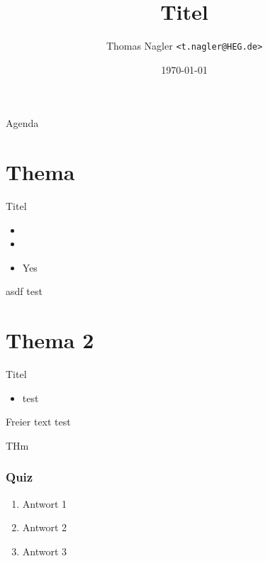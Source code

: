 \documentclass[11pt]{beamer}
\title{Titel}
\institute{Vorlesung}
\date{\today}
\author[T.~Nagler]{Thomas Nagler \texttt{<t.nagler@HEG.de>}}
\begin{document}

{ %
\begin{frame}[noframenumbering] 
	\titlepage
\end{frame}
}


\begin{frame}{Agenda}
	\tableofcontents
\end{frame}


\section{Thema}


\begin{frame}{Titel}

	\begin{itemize}
		\item {}    
		\item  {} 
		\item[\cmark] Yes
	\end{itemize}

	\begin{example}{asdf}
		test
	\end{example}
\end{frame}


\section{Thema 2}

\begin{frame}{Titel}


	\begin{itemize}
		\item test
	\end{itemize}

	\begin{block}{Freier text}
		test
	\end{block}

	\begin{theorem}
		THm
	\end{theorem}

\end{frame}


\begin{frame}
	\frametitle{Quiz}

	\begin{enumerate}
		\item Antwort 1
		\item Antwort 2
		\item Antwort 3 \onslide<2->{\cmark}
	\end{enumerate}

\end{frame}
\end{document}
